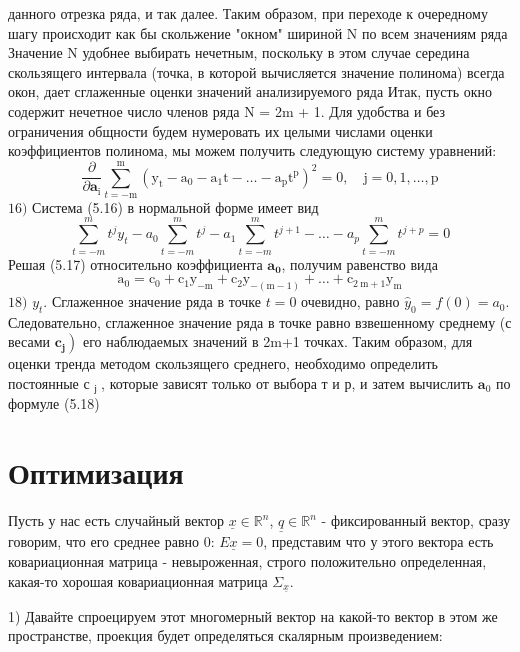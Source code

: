 \documentclass[a4paper, 12pt]{article}
\begin{document}
	данного отрезка ряда, и так далее. Таким образом, при переходе к очередному шагу происходит как бы скольжение "окном" шириной N по всем значениям ряда Значение N удобнее выбирать нечетным, поскольку в этом случае середина скользящего интервала (точка, в которой вычисляется значение полинома) всегда
	окон, дает сглаженные оценки значений анализируемого ряда
	Итак, пусть окно содержит нечетное число членов ряда N = 2m + 1. Для удобства и без ограничения общности будем нумеровать их целыми числами
	оценки коэффициентов полинома, мы можем получить следующую систему уравнений:
	$$
	\frac{\partial}{\partial \mathbf{a}_{\mathrm{i}}} \sum_{t=-\mathrm{m}}^{\mathrm{m}}\left(\mathrm{y}_{\mathrm{t}}-\mathrm{a}_{0}-\mathrm{a}_{1} \mathrm{t}-\ldots-\mathrm{a}_{\mathrm{p}} \mathrm{t}^{\mathrm{p}}\right)^{2}=0, \quad \mathrm{j}=0,1, \ldots, \mathrm{p}
	$$
	$16)$
	Система (5.16) в нормальной форме имеет вид
	$$
	\sum_{t=-m}^{m} t^{j} y_{t}-a_{0} \sum_{t=-m}^{m} t^{j}-a_{1} \sum_{t=-m}^{m} t^{j+1}-\ldots-a_{p} \sum_{t=-m}^{m} t^{j+p}=0
	$$
	Решая (5.17) относительно коэффициента $\mathbf{a}_{\mathbf{0}}$, получим равенство вида
	$$
	\mathrm{a}_{0}=\mathrm{c}_{0}+\mathrm{c}_{1} \mathrm{y}_{-\mathrm{m}}+\mathrm{c}_{2} \mathrm{y}_{-(\mathrm{m}-1)}+\ldots+\mathrm{c}_{2 \mathrm{~m}+1} \mathrm{y}_{\mathrm{m}}
	$$
	$18)$
	$y_{t} .$ Сглаженное значение ряда в точке $t=0$ очевидно, равно $\widehat{y}_{0}=f(0)=a_{0} .$ Следовательно, сглаженное значение ряда в точке равно взвешенному среднему
	(с весами $\left.\mathbf{c}_{\mathbf{j}}\right)$ его наблюдаемых значений в 2m+1 точках.
	Таким образом, для оценки тренда методом скользящего среднего, необходимо определить постоянные с $_{\text {ј }}$, которые зависят только от выбора т и р, и затем вычислить $\mathbf{a}_{0}$ по формуле (5.18)
	\section*{Оптимизация}
	Пусть у нас есть случайный вектор $\underline{x} \in \mathbb {R}^n$, $\underline{q} \in \mathbb {R}^n$ - фиксированный вектор, сразу говорим, что его среднее равно 0: $E\underline{x}=0$, представим что у этого вектора есть ковариационная матрица - невыроженная, строго положительно определенная, какая-то хорошая ковариационная матрица $\Sigma_{\underline{x}}$. 
	
	1) Давайте спроецируем этот многомерный вектор на какой-то вектор в этом же пространстве, проекция будет определяться скалярным произведением:
	
\end{document}
